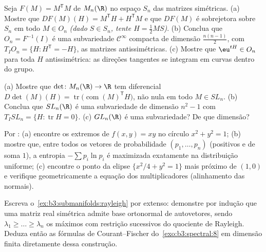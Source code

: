 \begin{exercise}[$\star\star$]\label{exo:b3:submanifolds:5}
Seja $F(M) = M^{\mathsf T}M$ de $M_n(\R)$ no espaço $S_n$ das matrizes simétricas.
(a) Mostre que $DF(M)(H) = M^{\mathsf T}H + H^{\mathsf T}M$ e que $DF(M)$ é sobrejetora sobre $S_n$ em
todo $M \in O_n$ \emph{(dado $S \in S_n$, tente $H = \frac12MS$)}.
(b) Conclua que $O_n = F^{-1}(I)$ é uma subvariedade $\mathcal C^\infty$ compacta de dimensão
$\frac{n(n-1)}2$, com $T_IO_n = \{H : H^{\mathsf T} = -H\}$, as matrizes antissimétricas.
(c) Mostre que $\eu^{tH} \in O_n$ para toda $H$ antissimétrica: as direções
tangentes se integram em curvas dentro do grupo.
\end{exercise}

\begin{exercise}[$\star\star$]\label{exo:b3:submanifolds:6}
(a) Mostre que $\det \colon M_n(\R) \to \R$ tem diferencial $D\det(M)(H) = \operatorname{tr}\bigl(\operatorname{com}(M)
^{\mathsf T}H\bigr)$, não nula em todo $M \in SL_n$.
(b) Conclua que $SL_n(\R)$ é uma subvariedade de dimensão $n^2 - 1$ com $T_ISL_n = \{H : \operatorname{tr}H = 0\}$.
(c) $GL_n(\R)$ é uma subvariedade? De que dimensão?
\end{exercise}

\begin{exercise}[$\star\star$]\label{exo:b3:submanifolds:7}
Por :
(a) encontre os extremos de $f(x,y) = xy$ no círculo $x^2 +
y^2 = 1$;
(b) mostre que, entre todos os vetores de probabilidade $(p_1, \dots,
p_n)$ (positivos
e de soma $1$), a entropia $-\sum
p_i\ln p_i$ é maximizada exatamente na
distribuição uniforme;
(c) encontre o ponto da elipse $\{x^2/4 + y^2 = 1\}$ mais próximo de $(1, 0)$ e
verifique geometricamente a equação dos multiplicadores (alinhamento das
normais).
\end{exercise}

\begin{exercise}[$\star\star\star$]\label{exo:b3:submanifolds:8}
Escreva o~\cref{ex:b3:submanifolds:rayleigh} por extenso: demonstre por indução que uma
matriz real simétrica admite base ortonormal de autovetores, sendo
$\lambda_1 \geq \dots \geq \lambda_n$ os máximos com restrição sucessivos do quociente de Rayleigh.
Deduza então as fórmulas de Courant--Fischer do~\cref{exo:b3:spectral:8} em
dimensão finita diretamente dessa construção.
\end{exercise}

